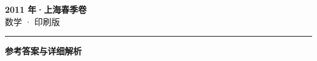 \documentclass[zihao=5, a4paper]{ctexart}
\begin{document}
\begin{center}
  {\Large\bfseries 2011 年·上海春季卷}\\[4pt]
  {\large 数学 · 印刷版}
\end{center}
\medskip
{}

\par\bigskip\hrule\bigskip
{}
\begin{center}{\large\bfseries 参考答案与详细解析}\end{center}
\smallskip

\end{document}
